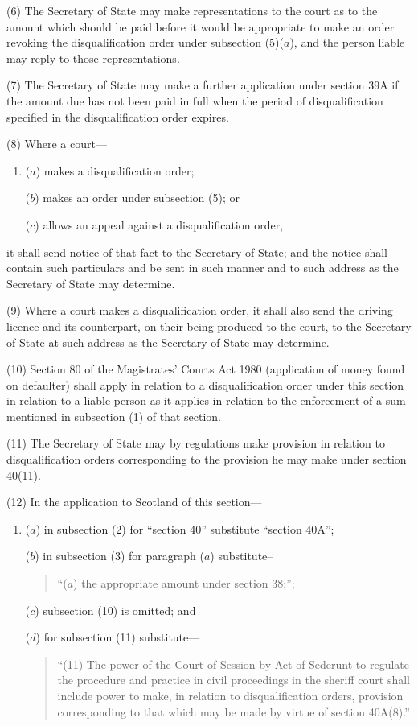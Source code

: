 \documentclass[12pt,a4paper]{article}
\begin{document}
(6)
The Secretary of State may make representations to the court as to the amount which should be paid before it would be appropriate to make an order revoking the disqualification order under subsection (5)($a$), and the person liable may reply to those representations.

(7)
The Secretary of State may make a further application under section 39A if the amount due has not been paid in full when the period of disqualification specified in the disqualification order expires.

(8)
Where a court---
\begin{enumerate}\item[]
($a$) makes a disqualification order;

($b$) makes an order under subsection (5); or

($c$) allows an appeal against a disqualification order,
\end{enumerate}
it shall send notice of that fact to the Secretary of State; and the notice shall contain such particulars and be sent in such manner and to such address as the Secretary of State may determine.

(9)
Where a court makes a disqualification order, it shall also send the driving licence and its counterpart, on their being produced to the court, to the Secretary of State at such address as the Secretary of State may determine.

(10)
Section 80 of the Magistrates’ Courts Act 1980 (application of money found on defaulter) shall apply in relation to a disqualification order under this section in relation to a liable person as it applies in relation to the enforcement of a sum mentioned in subsection (1) of that section.

(11)
The Secretary of State may by regulations make provision in relation to disqualification orders corresponding to the provision he may make under section 40(11).

(12)
In the application to Scotland of this section---
\begin{enumerate}\item[]
($a$) in subsection (2) for “section 40” substitute “section 40A”;

($b$) in subsection (3) for paragraph ($a$) substitute– 
\begin{quotation}
“($a$) the appropriate amount under section 38;”;
\end{quotation}

($c$) subsection (10) is omitted; and

($d$) for subsection (11) substitute---
\begin{quotation}
 “(11) The power of the Court of Session by Act of Sederunt to regulate the procedure and practice in civil proceedings in the sheriff court shall include power to make, in relation to disqualification orders, provision corresponding to that which may be made by virtue of section 40A(8).”
\end{quotation}
\end{enumerate}
\end{document}
